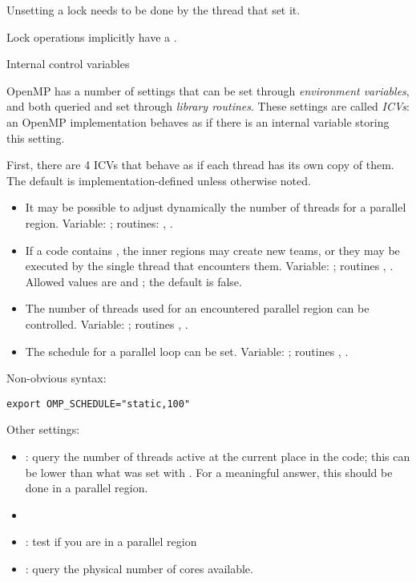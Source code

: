 Unsetting a lock needs to be done by the thread that set it.

Lock operations implicitly have a .

 {Internal control variables}
\label{ref:omp-environ}

OpenMP has a number of settings that can be set through \emph{environment variables},
and both queried and set through \emph{library routines}. These settings are called
\emph{\acfp{ICV}}: an OpenMP implementation behaves as if there is an internal variable
storing this setting.

First, there are 4 \acp{ICV} that behave as if each thread has its own copy of them.
The default is implementation-defined unless otherwise noted.
\begin{itemize}
  \item It may be possible to adjust dynamically the number of threads
    for a parallel region. Variable: ;
    routines: ,
    .
  \item If a code contains ,
    the inner regions may create new teams, or they may be executed by
    the single thread that encounters them. Variable:
    ; routines ,
    . Allowed values are  and
    ; the default is false.
  \item The number of threads used for an encountered parallel region
    can be controlled. Variable: ;
    routines ,
    .
  \item The schedule for a parallel loop can be set. Variable:
    ; routines
    , .
\end{itemize}

Non-obvious syntax:
\begin{verbatim}
export OMP_SCHEDULE="static,100"
\end{verbatim}

Other settings:
\begin{itemize}
\item{}: query the number of threads
  active at the current place in the code; this can be lower than what
  was set with . For a meaningful answer, this
  should be done in a parallel region.
\item{}
\item{}: test if you are in a parallel region
\item{}: query the physical number of cores available.
\end{itemize}

